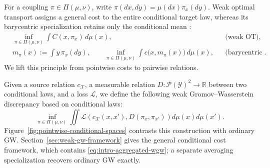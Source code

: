 \documentclass[11pt]{article}
\newcommand{\R}{\mathbb R}
\theoremstyle{plain}
\theoremstyle{definition}
\theoremstyle{remark}
\begin{document}
For a coupling $\pi\in\Pi(\mu,\nu)$, write
$\pi(dx,dy)=\mu(dx)\pi_x(dy)$. Weak optimal transport assigns a general cost to
the entire conditional target law, whereas its barycentric specialization retains
only the conditional mean \cite{GRST,BBP}:
\[
\begin{aligned}
 &\inf_{\pi\in\Pi(\mu,\nu)}\int C(x,\pi_x)\,d\mu(x),
 &&\text{(weak OT)},\\
 &m_\pi(x):=\int y\,\pi_x(dy),\qquad
 \inf_{\pi\in\Pi(\mu,\nu)}\int c\bigl(x,m_\pi(x)\bigr)\,d\mu(x),
 &&\text{(barycentric weak OT)}.
\end{aligned}
\]
We lift this principle from pointwise costs to pairwise relations.

Given a source relation $c_{\mathcal X}$, a measurable relation
$D:\mathcal P(\mathcal Y)^2\to\R$ between two conditional laws, and a loss
$\mathcal L$, we define the following weak Gromov--Wasserstein discrepancy based
on conditional laws:
\begin{equation}\label{eq:intro-aggregated-wgw}
 \inf_{\pi\in\Pi(\mu,\nu)}
 \iint \mathcal L\!\left(c_{\mathcal X}(x,x'),
 D(\pi_x,\pi_{x'})\right)d\mu(x)d\mu(x').
\end{equation}
Figure~\ref{fig:pointwise-conditional-spaces} contrasts this construction with
ordinary GW. Section~\ref{sec:weak-gw-framework} gives the general conditional
cost framework, which contains \eqref{eq:intro-aggregated-wgw}; a separate
averaging specialization recovers ordinary GW exactly.
\end{document}

